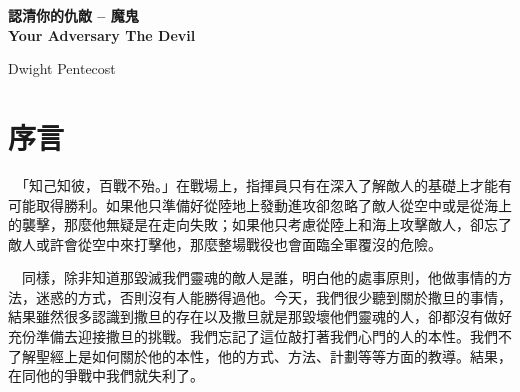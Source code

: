 \documentclass{book}
\author{
  Editor, Michael Chan\\
  \texttt{chchan@link.cuhk.edu.hk}
}
\begin{document}
\clearpage
\newcommand\nbvspace[1][3]{\vspace*{\stretch{#1}}}
\newcommand\nbstretchyspace{\spaceskip0.5em plus 0.25em minus 0.25em}
\newcommand{\nbtitlestretch}{\spaceskip0.6em}
\pagestyle{empty}
\begin{center}
\bfseries
\nbvspace[1]
\Huge
{%
\huge
\textbf{認清你的仇敵 -- 魔鬼\\Your Adversary The Devil}}

\nbvspace[1]

{\large
Dwight Pentecost
}

\nbvspace[1]




\end{center}

\newpage

\setcounter{tocdepth}{0}
\dominitoc
\Large
{}
\tableofcontents

\Large

\chapter*{序言}
\label{subsec:prolog}
　「知己知彼，百戰不殆。」在戰場上，指揮員只有在深入了解敵人的基礎上才能有可能取得勝利。如果他只準備好從陸地上發動進攻卻忽略了敵人從空中或是從海上的襲擊，那麼他無疑是在走向失敗；如果他只考慮從陸上和海上攻擊敵人，卻忘了敵人或許會從空中來打擊他，那麼整場戰役也會面臨全軍覆沒的危險。

　同樣，除非知道那毀滅我們靈魂的敵人是誰，明白他的處事原則，他做事情的方法，迷惑的方式，否則沒有人能勝得過他。今天，我們很少聽到關於撒旦的事情，結果雖然很多認識到撒旦的存在以及撒旦就是那毀壞他們靈魂的人，卻都沒有做好充份準備去迎接撒旦的挑戰。我們忘記了這位敲打著我們心門的人的本性。我們不了解聖經上是如何關於他的本性，他的方式、方法、計劃等等方面的教導。結果，在同他的爭戰中我們就失利了。
\end{document}
